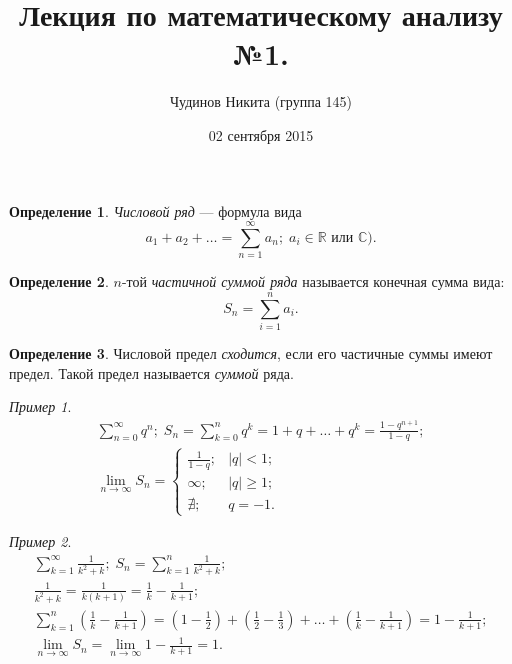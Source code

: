 \documentclass[a4paper,12pt]{article}
\theoremstyle{remark}
\newtheorem*{example}{Пример}
\theoremstyle{definition}
\newtheorem{definition}{Определение}
\begin{document}
\sloppy
\author{Чудинов Никита (группа 145)}
\date{02 сентября 2015}
\title{\vspace{-2.0cm}Лекция по математическому анализу №1.}
\frenchspacing

\maketitle


\begin{definition}
\emph{Числовой ряд} --- формула вида
\begin{equation*}
	a_1 + a_2 + \dots = \sum^{\infty}_{n = 1} a_n;\; a_i \in \mathbb{R} \text{ или } \mathbb{C}).
\end{equation*}
\end{definition}

\begin{definition}
\(n\)-той \emph{частичной суммой ряда} называется конечная сумма вида:
\begin{equation*}
	S_n = \sum^{n}_{i = 1} a_i.
\end{equation*}
\end{definition}

\begin{definition}
Числовой предел \emph{сходится}, если его частичные суммы имеют предел. Такой предел называется \emph{суммой} ряда.
\end{definition}

\begin{example}
\begin{gather*}
	\sum^{\infty}_{n = 0} q^n;\; S_n = \sum^{n}_{k = 0} q^k = 1 + q + \dots + q^k = \frac{1 - q^{n+1}}{1-q}; \\
	\lim_{n \rightarrow \infty} S_n =
	\begin{cases}
		\frac{1}{1 - q}; &|q| < 1; \\
		\infty; &|q| \geqslant 1; \\
		\nexists; &q = -1.
	\end{cases}
\end{gather*}
\end{example}

\begin{example}
\begin{gather*}
	\sum^{\infty}_{k = 1} \frac{1}{k^2 + k} ;\; S_n = \sum^{n}_{k = 1} \frac{1}{k^2 + k}; \\
	\frac{1}{k^2 + k} = \frac{1}{k (k + 1)} = \frac{1}{k} - \frac{1}{k + 1}; \\
	\sum^{n}_{k = 1} \left(\frac{1}{k} - \frac{1}{k + 1}\right) = \left(1 - \frac{1}{2}\right) + \left(\frac{1}{2} - \frac{1}{3}\right) + \dots + \left(\frac{1}{k} - \frac{1}{k + 1}\right) = 1 - \frac{1}{k + 1}; \\
	\lim_{n \rightarrow \infty} S_n = \lim_{n \rightarrow \infty} 1 - \frac{1}{k + 1} = 1.
\end{gather*}
\end{example}
\end{document}
